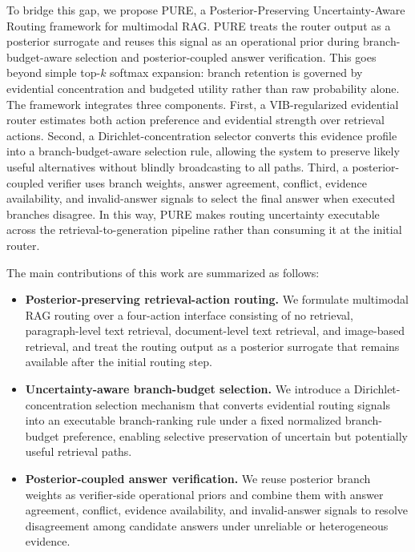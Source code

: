 \documentclass[a4paper,fleqn]{cas-dc}
\begin{document}
To bridge this gap, we propose PURE, a Posterior-Preserving Uncertainty-Aware Routing framework for multimodal RAG. PURE treats the router output as a posterior surrogate and reuses this signal as an operational prior during branch-budget-aware selection and posterior-coupled answer verification. This goes beyond simple top-$k$ softmax expansion: branch retention is governed by evidential concentration and budgeted utility rather than raw probability alone. The framework integrates three components. First, a VIB-regularized evidential router estimates both action preference and evidential strength over retrieval actions. Second, a Dirichlet-concentration selector converts this evidence profile into a branch-budget-aware selection rule, allowing the system to preserve likely useful alternatives without blindly broadcasting to all paths. Third, a posterior-coupled verifier uses branch weights, answer agreement, conflict, evidence availability, and invalid-answer signals to select the final answer when executed branches disagree. In this way, PURE makes routing uncertainty executable across the retrieval-to-generation pipeline rather than consuming it at the initial router.

The main contributions of this work are summarized as follows:

\begin{itemize}
\item \textbf{Posterior-preserving retrieval-action routing.} We formulate multimodal RAG routing over a four-action interface consisting of no retrieval, paragraph-level text retrieval, document-level text retrieval, and image-based retrieval, and treat the routing output as a posterior surrogate that remains available after the initial routing step.

\item \textbf{Uncertainty-aware branch-budget selection.} We introduce a Dirichlet-concentration selection mechanism that converts evidential routing signals into an executable branch-ranking rule under a fixed normalized branch-budget preference, enabling selective preservation of uncertain but potentially useful retrieval paths.

\item \textbf{Posterior-coupled answer verification.} We reuse posterior branch weights as verifier-side operational priors and combine them with answer agreement, conflict, evidence availability, and invalid-answer signals to resolve disagreement among candidate answers under unreliable or heterogeneous evidence.
\end{itemize}
\end{document}
